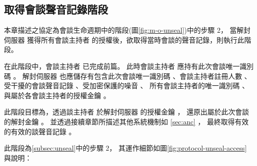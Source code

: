 \subsection{取得會談聲音記錄階段}

    本章描述之協定為會談生命週期中的階段(圖\ref{fig:m-o-unseal})中的步驟 2，
當解封伺服器 \DEFserver 獲得所有會談主持者 \DEFownerAll 的授權後，欲取得當時會談的聲音記錄，則執行此階段。

    在此階段中，會談主持者 \DEFowner 已完成前篇。
此時會談主持者 \DEFowner 應持有此次會談唯一識別碼 \DEFsessionID。
解封伺服器 \DEFserver 也應儲存有包含此次會談唯一識別碼 \DEFsessionID、會談主持者註冊人數 \DEFowreg、
受干擾的會談聲音記錄 \DEFrecJ、受加密保護的噪音 \DEFrecP、
所有會談主持者的唯一識別碼 \DEFownerID、與屬於各會談主持者的授權金鑰 \DEFagentKey。

    此階段目標為，透過談主持者 \DEFowner 於解封伺服器 \DEFserver 的授權金鑰 \DEFagentKey，
還原出屬於此次會談的解封金鑰 \DEFunsealKey。
並透過接續章節所描述其他系統機制如 \ref{sec:anc} ，
最終取得有效的有效的談聲音記錄 \DEFrecREV。

    此階段為\ref{subsec:unseal}中的步驟 2，
其運作細節如圖\ref{fig:protocol-unseal-access}與說明：


